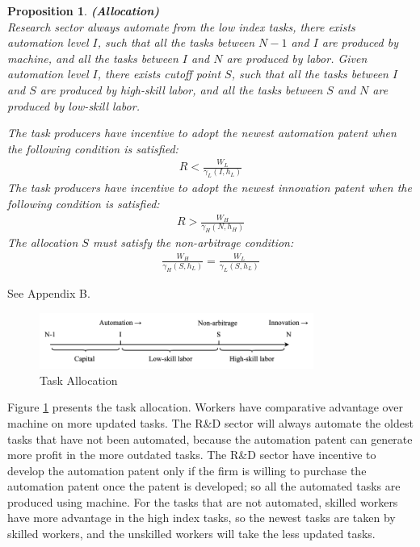 \documentclass[12pt]{article}
\newtheorem{proposition}{Proposition}
\begin{document}
\begin{proposition}{\bf (Allocation)} \\

Research sector always automate from the low index tasks, there exists automation level $I$, such that all the tasks between $N-1$ and $I$ are produced by machine, and all the tasks between $I$ and $N$ are produced by labor. Given automation level $I$, there exists cutoff point $S$, such that all the tasks between $I$ and $S$ are produced by high-skill labor, and all the tasks between $S$ and $N$ are produced by low-skill labor. 

The task producers have incentive to adopt the newest automation patent when the following condition is satisfied:
\begin{align*}
R < \frac{W_L}{\gamma_L(I,h_L)}
\end{align*}
The task producers have incentive to adopt the newest innovation patent when the following condition is satisfied: 
\begin{align*}
R > \frac{W_H}{\gamma_H(N,h_H)}
\end{align*}
The allocation $S$ must satisfy the non-arbitrage condition: 
\begin{align*}
\frac{W_H}{\gamma_H(S,h_L)} = \frac{W_L}{\gamma_L(S,h_L)}
\end{align*}
\end{proposition}
 See Appendix B.

\begin{figure}[h!]
\center
\includegraphics[width=0.8\textwidth]{allocation}
\caption{Task Allocation}
\label{allocation}
\end{figure}
Figure \ref{allocation} presents the task allocation. Workers have comparative advantage over machine on more updated tasks. The R\&D sector will always automate the oldest tasks that have not been automated, because the automation patent can generate more profit in the more outdated tasks. The R\&D sector have incentive to develop the automation patent only if the firm is willing to purchase the automation patent once the patent is developed; so all the automated tasks are produced using machine. For the tasks that are not automated, skilled workers have more advantage in the high index tasks, so the newest tasks are taken by skilled workers, and the unskilled workers will take the less updated tasks. 
\end{document}
